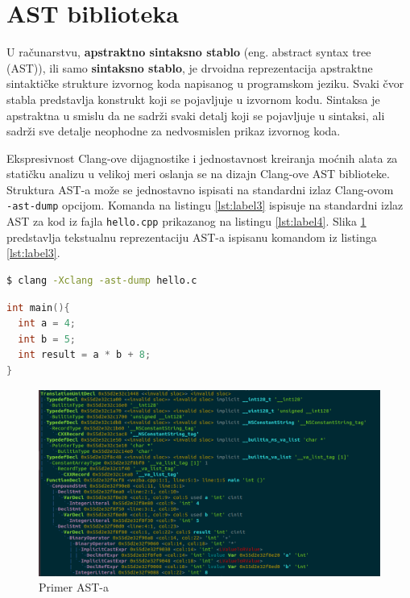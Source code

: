 \documentclass[12pt,oneside]{memoir}
\begin{document}
\section{AST biblioteka}

U računarstvu, \textbf{apstraktno sintaksno stablo} (eng. abstract syntax tree (AST)), ili samo \textbf{sintaksno stablo}, je drvoidna reprezentacija apstraktne sintaktičke strukture izvornog koda napisanog u programskom jeziku. Svaki čvor stabla predstavlja konstrukt koji se pojavljuje u izvornom kodu.
Sintaksa je apstraktna u smislu da ne sadr\v{z}i svaki detalj koji se pojavljuje u sintaksi, ali sadr\v{z}i sve detalje neophodne za nedvosmislen prikaz izvornog koda.

Ekspresivnost Clang-ove dijagnostike i jednostavnost kreiranja mo\'{c}nih alata za stati\v{c}ku analizu u velikoj meri oslanja se na dizajn Clang-ove AST biblioteke. Struktura AST-a mo\v{z}e se jednostavno ispisati na standardni izlaz Clang-ovom \\ \lstinline{-ast-dump} opcijom. Komanda na listingu \ref{lst:label3} ispisuje na standardni izlaz AST za kod iz fajla \lstinline{hello.cpp} prikazanog na listingu \ref{lst:label4}. Slika \ref{fig:grafikon} predstavlja tekstualnu reprezentaciju AST-a ispisanu komandom iz listinga \ref{lst:label3}.
\\


\begin{lstlisting}[caption={Komanda za ispisivanje Clang-ovog AST-a},label=lst:label3,language=bash, captionpos=b]
$ clang -Xclang -ast-dump hello.c
\end{lstlisting}

\begin{lstlisting}[caption={Kod \v{c}iji je AST prikazan na slici 4.1},label=lst:label4,language=C++, captionpos=b]
int main(){
  int a = 4;
  int b = 5;
  int result = a * b + 8;
}
\end{lstlisting}

\begin{figure}[!ht]
  \centering
  \includegraphics[width=1.0\textwidth]{ASTImage.png}
  \caption{Primer AST-a}
  \label{fig:grafikon}
\end{figure}
\end{document}
